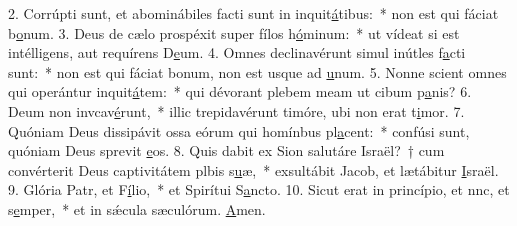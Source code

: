 2. Corrúpti sunt, et abominábiles facti sunt in inquit\uline{á}tibus:~* non est qui fáciat b\uline{o}num.
3. Deus de cælo prospéxit super fílos h\uline{ó}minum:~* ut vídeat si est intélligens, aut requírens D\uline{e}um.
4. Omnes declinavérunt simul inútles f\uline{a}cti sunt:~* non est qui fáciat bonum, non est usque ad \uline{u}num.
5. Nonne scient omnes qui operántur inquit\uline{á}tem:~* qui dévorant plebem meam ut cibum p\uline{a}nis?
6. Deum non invcav\uline{é}runt,~* illic trepidavérunt timóre, ubi non erat t\uline{i}mor.
7. Quóniam Deus dissipávit ossa eórum qui homínbus pl\uline{a}cent:~* confúsi sunt, quóniam Deus sprevit \uline{e}os.
8. Quis dabit ex Sion salutáre Israël?~† cum convérterit Deus captivitátem plbis s\uline{u}æ,~* exsultábit Jacob, et lætábitur \uline{I}sraël.
9. Glória Patr, et F\uline{í}lio,~* et Spirítui S\uline{a}ncto.
10. Sicut erat in princípio, et nnc, et s\uline{e}mper,~* et in sǽcula sæculórum. \uline{A}men.
